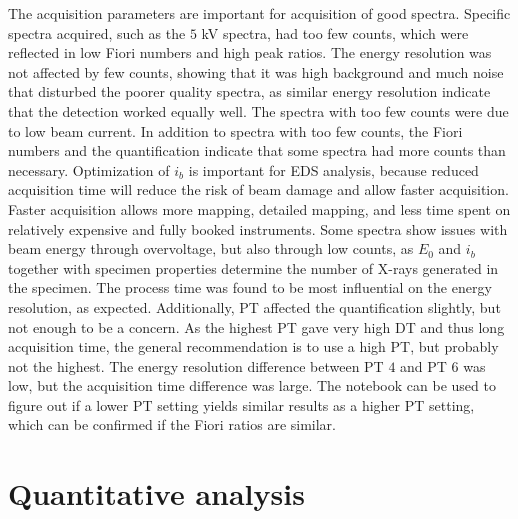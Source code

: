 The acquisition parameters are important for acquisition of good spectra.
Specific spectra acquired, such as the $5$ kV spectra, had too few counts, which were reflected in low Fiori numbers and high peak ratios.
The energy resolution was not affected by few counts, showing that it was high background and much noise that disturbed the poorer quality spectra, as similar energy resolution indicate that the detection worked equally well.
The spectra with too few counts were due to low beam current.
In addition to spectra with too few counts, the Fiori numbers and the quantification indicate that some spectra had more counts than necessary.
Optimization of $i_b$ is important for EDS analysis, because reduced acquisition time will reduce the risk of beam damage and allow faster acquisition.
Faster acquisition allows more mapping, detailed mapping, and less time spent on relatively expensive and fully booked instruments.
Some spectra show issues with beam energy through overvoltage, but also through low counts, as  $E_0$ and $i_b$ together with specimen properties determine the number of X-rays generated in the specimen.
The process time was found to be most influential on the energy resolution, as expected.
Additionally, PT affected the quantification slightly, but not enough to be a concern.
As the highest PT gave very high DT and thus long acquisition time, the general recommendation is to use a high PT, but probably not the highest.
The energy resolution difference between PT $4$ and PT $6$ was low, but the acquisition time difference was large.
The notebook can be used to figure out if a lower PT setting yields similar results as a higher PT setting, which can be confirmed if the Fiori ratios are similar.





























\section{Quantitative analysis}
\label{discussion:quantitative}


